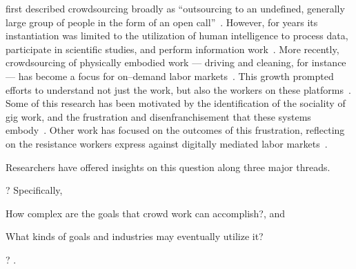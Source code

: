 \documentclass[trackingWork]{subfiles}
\begin{document}
\citeauthor{howe2008crowdsourcing} first described crowdsourcing broadly as
``outsourcing to an undefined, generally large group of people in the form of an open call''~\cite{howe2008crowdsourcing}.
However, for years its instantiation was limited to the utilization of
human intelligence to process data, participate in scientific studies, and perform information work~\cite{CrowdsourcingUserStudies,movieSummarizationWu,
      yuenSurvey,geiger2011managing,quinnbedersonTaxonomy}.
More recently, crowdsourcing of physically embodied work
--- driving and cleaning, for instance ---
has become a focus for on--demand labor markets~\cite{uberAlgorithm,uberOfficial,zaarlyOfficial,taskrabbitOfficial}.
This growth prompted efforts to understand not just the work, but also the workers on these platforms~\cite{Ross,whoareNOTtheTurkers}.
Some of this research has been motivated by the identification of the sociality of gig work,
and the frustration and disenfranchisement that these systems embody~\cite{turkopticon,martin2014being,takingAHITMcInnis}.
Other work has focused on the outcomes of this frustration,
reflecting on the resistance workers express against digitally mediated labor markets~\cite{uberAlgorithm,dynamo}.

Researchers have offered insights on this question along three major threads.
\begin{Numberlist}[itemjoin*={.~And~},itemjoin={.~}]
  \item {}?
        Specifically,
        \begin{inlinelist}[label=(\alph*)]
          \item How complex are the goals that crowd work can accomplish?, and
          \item What kinds of goals and industries may eventually utilize it?
        \end{inlinelist}
        \cite{foundry,suzukiAtelier,KimStoria,yuanAlmost,YuEncouragingOutside,
              Nebeling:2016:WCW:2858036.2858169,
              Hahn:2016:KAB:2858036.2858364}
  \item {}
        \cite{embracingErrorKrishna,bernsteinSoylent,sensitiveTasks,
              LykourentzouPersonalityMatters,KucherbaevReLauncher,
              Law:2016:CKC:2858036.2858144,Cai:2016:CRI:2858036.2858237,
              Chang:2016:ACC:2858036.2858411,Newell:2016:OMA:2858036.2858490}
  \item {}?
        \cite{turkopticon,storiesIraniSilberman,dynamo,crowdcollab,
              whyWouldAnyoneBrewer,takingAHITMcInnis}.
\end{Numberlist}
\end{document}
